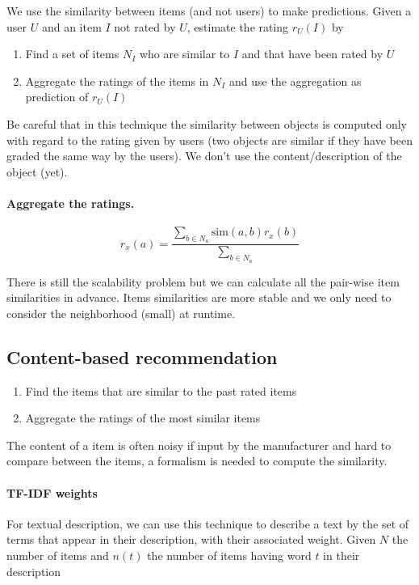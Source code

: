 We use the similarity between items (and not users) to make predictions. Given a user $U$ and an item $I$ not rated by $U$, estimate the rating $r_U(I)$ by

\begin{enumerate}
  \item Find a set of items $N_I$ who are similar to $I$ and that have been rated by $U$
  \item Aggregate the ratings of the items in $N_I$ and use the aggregation as prediction of $r_U(I)$
\end{enumerate}

Be careful that in this technique the similarity between objects is computed only with regard to the rating given by users (two objects are similar if they have been graded the same way by the users). We don't use the content/description of the object (yet).

\paragraph{Aggregate the ratings.}

\[
  r_x(a) = \frac{\sum_{b\in N_a} \text{sim}(a,b) r_x(b)}{\sum_{b\in N_a}}
\]

There is still the scalability problem but we can calculate all the pair-wise item similarities in advance. Items similarities are more stable and we only need to consider the neighborhood (small) at runtime.

\subsection{Content-based recommendation}

\begin{enumerate}
  \item Find the items that are similar to the past rated items
  \item Aggregate the ratings of the most similar items
\end{enumerate}

The content of a item is often noisy if input by the manufacturer and hard to compare between the items, a formalism is needed to compute the similarity.

\paragraph{TF-IDF weights} For textual description, we can use this technique to describe a text by the set of terms that appear in their description, with their associated weight. Given $N$ the number of items and $n(t)$ the number of items having word $t$ in their description

